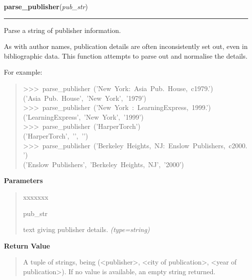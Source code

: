     \label{biblio:webquery:utils:parse_publisher}

    \vspace{0.5ex}

\hspace{.8\funcindent}\begin{boxedminipage}{\funcwidth}

    \raggedright \textbf{parse\_publisher}(\textit{pub\_str})

    \vspace{-1.5ex}

    \rule{\textwidth}{0.5\fboxrule}
\setlength{\parskip}{2ex}

Parse a string of publisher information.

As with author names, publication details are often inconsistently set out,
even in bibliographic data. This function attempts to parse out and
normalise the details.

For example:
\begin{quote}{\ttfamily \raggedright \noindent
>{}>{}>~parse{\_}publisher~('New~York:~Asia~Pub.~House,~c1979.')~\\
('Asia~Pub.~House',~'New~York',~'1979')~\\
>{}>{}>~parse{\_}publisher~('New~York~:~LearningExpress,~1999.')~\\
('LearningExpress',~'New~York',~'1999')~\\
>{}>{}>~parse{\_}publisher~('HarperTorch')~\\
('HarperTorch',~'{}',~'{}')~\\
>{}>{}>~parse{\_}publisher~('Berkeley~Heights,~NJ:~Enslow~Publishers,~c2000.')~\\
('Enslow~Publishers',~'Berkeley~Heights,~NJ',~'2000')
}\end{quote}
\setlength{\parskip}{1ex}
      \textbf{Parameters}
      \vspace{-1ex}

      \begin{quote}
        \begin{Ventry}{xxxxxxx}

          \item[pub\_str]


text giving publisher details.
            {\it (type=string)}

        \end{Ventry}

      \end{quote}

      \textbf{Return Value}
    \vspace{-1ex}

      \begin{quote}

A tuple of strings, being ({\textless}publisher{\textgreater}, {\textless}city of publication{\textgreater},
{\textless}year of publication{\textgreater}). If no value is available, an empty string
returned.
      \end{quote}

    \end{boxedminipage}


